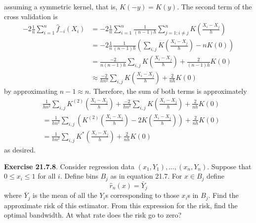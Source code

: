 assuming a symmetric kernel, that is, \(K(-y) = K(y)\).
The second term of the cross validation is
\begin{align*}
- 2 \frac{1}{n} \sum_{i=1}^{n} \hat{f}_{-i}(X_{i})
&= -2 \frac{1}{n} \sum_{i=1}^{n} \frac{1}{(n - 1) h} \sum_{j=1; i \neq j}^{n} K \left( \frac{X_{i} - X_{j}}{h} \right) \\
&= -2 \frac{1}{n} \frac{1}{(n - 1) h} \left( \sum_{i, j} K \left( \frac{X_{i} - X_{j}}{h} \right) - n K(0)\right) \\
&= \frac{-2}{n (n - 1) h} \sum_{i, j} K \left( \frac{X_{i} - X_{j}}{h} \right)
+ \frac{2}{(n - 1) h} K(0) \\
&\approx \frac{-2}{h n^{2}} \sum_{i, j} K \left( \frac{X_{i} - X_{j}}{h} \right)
+ \frac{2}{nh} K(0)
\end{align*}
by approximating \(n - 1 \approx n\).
Therefore, the sum of both terms is approximately
\begin{align*}
&\frac{1}{hn^{2}} \sum_{i, j} K^{(2)} \left(\frac{X_{i} - X_{j}}{h} \right) + \frac{-2}{h n^{2}} \sum_{i, j} K \left( \frac{X_{i} - X_{j}}{h} \right)
+ \frac{2}{nh} K(0) \\
&= \frac{1}{hn^{2}} \sum_{i, j} \left( K^{(2)} \left(\frac{X_{i} - X_{j}}{h} \right) - 2 K \left( \frac{X_{i} - X_{j}}{h} \right) \right) + \frac{2}{nh} K(0) \\
&= \frac{1}{hn^{2}} \sum_{i, j} K^{*} \left(\frac{X_{i} - X_{j}}{h} \right) + \frac{2}{nh} K(0)
\end{align*}
as desired.

\textbf{Exercise 21.7.8}. Consider regression data
\((x_{1}, Y_{1}), \dots, (x_{n}, Y_{n})\). Suppose that \(0 \leq x_{i} \leq 1\)
for all \(i\). Define bins \(B_{j}\) as in equation 21.7. For
\(x \in B_{j}\) define
\[
\hat{r}_{n}(x) = \bar{Y}_{j}
\]
where \(\bar{Y}_{j}\) is the mean of all the \(Y_{i}\)s corresponding
to those \(x_{i}\)s in \(B_{j}\). Find the approximate risk of this
estimator. From this expression for the risk, find the optimal
bandwidth. At what rate does the risk go to zero?

